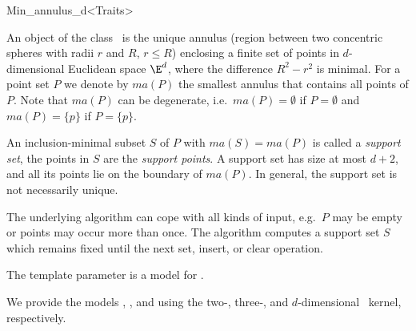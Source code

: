 
\begin{ccRefClass}{Min_annulus_d<Traits>}


\ccSaveThreeColumns
\cgalMinAnnulusLayout

\ccDefinition

An object of the class \ccRefName\ is the unique annulus (region between
two concentric spheres with radii $r$ and $R$, $r \leq R$) enclosing a
finite set of points in $d$-dimensional Euclidean space $\E^d$, where the
difference $R^2-r^2$ is minimal. For a point set $P$ we denote by $ma(P)$
the smallest annulus that contains all points of $P$.  Note that $ma(P)$
can be degenerate,
i.e.~$ma(P)=\emptyset$ if
$P=\emptyset$ and $ma(P)=\{p\}$ if
$P=\{p\}$.

An inclusion-minimal subset $S$ of $P$ with $ma(S)=ma(P)$ is called a
\emph{support set},
the points in $S$ are the \emph{support points}.  A support set has size at
most $d+2$, and all its points lie on the boundary of $ma(P)$. In general,
the support set is not necessarily unique.

The underlying algorithm can cope with all kinds of input, e.g.~$P$ may be
empty or points may occur more than once. The algorithm computes a support
set $S$ which remains fixed until the next set, insert, or clear operation.


\ccRequirements
\ccIndexRequirements

The template parameter  is a model for .

We provide the models ,
, and  using the
two-, three-, and $d$-dimensional \cgal~kernel, respectively.

\ccTypes
\ccIndexClassTypes



\end{ccRefClass}
